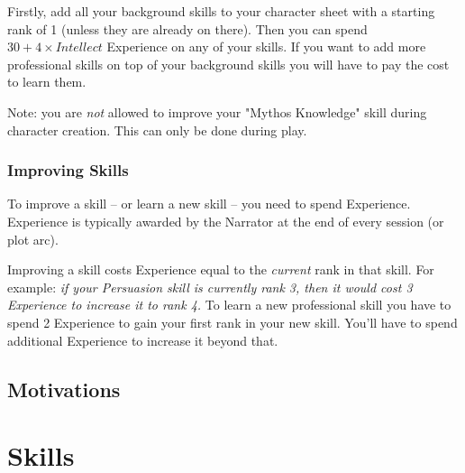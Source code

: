 Firstly, add all your background skills to your character sheet with a starting rank of 1 (unless they are already on there). 
Then you can spend $30 + 4 \times Intellect$ Experience on any of your skills.
If you want to add more professional skills on top of your background skills
you will have to pay the cost to learn them.

Note: you are \textit{not} allowed to improve your "Mythos Knowledge" skill during character creation.
This can only be done during play. 

\subsection{Improving Skills}
To improve a skill -- or learn a new skill -- you need to spend Experience.
Experience is typically awarded by the Narrator at the end of every session (or plot arc).

Improving a skill costs Experience equal to the \textit{current} rank in that skill.
For example: \textit{if your Persuasion skill is currently rank 3, then it would cost 3 Experience to increase it to rank 4.}
To learn a new professional skill you have to spend 2 Experience to gain your first rank in your new skill.
You'll have to spend additional Experience to increase it beyond that.






\section{Motivations}


\chapter{Skills}

